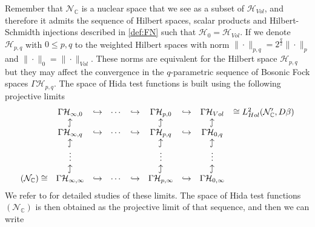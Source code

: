\documentclass{elsarticle}%
\begin{document}
 Remember that $\mathcal{N}_{\mathbb{C}}$ is a nuclear space that we see as a subset of $\mathcal{H}_{Vol}$, and therefore it admits the sequence of Hilbert spaces, scalar products and Hilbert-Schmidth injections described in \autoref{def:FN} such that $\mathcal{H}_0=\mathcal{H}_{Vol}$. If we denote $\mathcal{H}_{p,q}$ with  $0\leq p,q$ to the weighted Hilbert spaces with norm $\| \cdot \|_{p,q}={2}^\frac{q}{2}\| \cdot \|_p $ and $\| \cdot \|_0=\| \cdot \|_{Vol}$. These norms are equivalent for the Hilbert space $\mathcal{H}_{p,q}$ but they may affect the convergence in the $q$-parametric sequence of Bosonic Fock spaces $\Gamma \mathcal{H}_{p,q}$. The space of Hida test functions is built using the following projective limits 
\begin{equation}
    \label{eqn:limitsHida}
  \begin{array}{rcccccccl}
      &\Gamma \mathcal{H}_{\infty,0}& \hookrightarrow  &\cdots & \hookrightarrow & \Gamma \mathcal{H}_{p,0}  & \hookrightarrow  &
      \Gamma \mathcal{H}_{Vol}
      &\cong L^2_{Hol}(\mathcal{N}'_{\mathbb{C}},D\beta) \\
      &\rotatebox[origin=c]{90}{$\hookrightarrow$} & & & & \rotatebox[origin=c]{90}{$\hookrightarrow$} 
      & &\rotatebox[origin=c]{90}{$\hookrightarrow$} \\
      &
      \Gamma \mathcal{H}_{\infty,q} & \hookrightarrow  &\cdots & \hookrightarrow & \Gamma \mathcal{H}_{p,q} & \hookrightarrow &\Gamma \mathcal{H}_{0,q} 
      \\
      &\rotatebox[origin=c]{90}{$\hookrightarrow$} & & & & \rotatebox[origin=c]{90}{$\hookrightarrow$} 
      & &\rotatebox[origin=c]{90}{$\hookrightarrow$} \\
      &\vdots & & & & \vdots
      & & \vdots \\
      &\rotatebox[origin=c]{90}{$\hookrightarrow$} & & & & \rotatebox[origin=c]{90}{$\hookrightarrow$} 
      & &\rotatebox[origin=c]{90}{$\hookrightarrow$} \\
      (\mathcal{N}_{\mathbb{C}})\cong 
      &
      \Gamma \mathcal{H}_{\infty,\infty} & \hookrightarrow  &\cdots & \hookrightarrow & \Gamma \mathcal{H}_{p,\infty} & \hookrightarrow &\Gamma \mathcal{H}_{0,\infty} 
  \end{array}
\end{equation}
We refer to \cite{kondratievGeneralizedFunctionals1996,obataWhiteNoise1994, hidaWhiteNoise1993, kuoWhiteNoise1996,westerkampRecentResults2003} for detailed studies of these limits. The space of Hida test functions $(\mathcal{N}_{\mathbb{C}})$ is then obtained as the projective limit of that sequence, and then we can write
\end{document}
